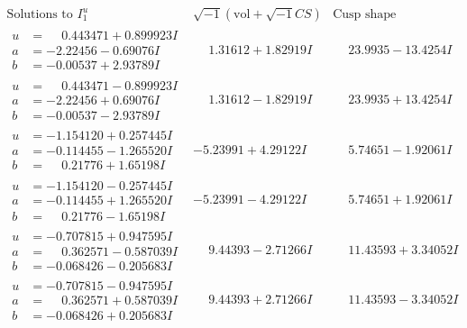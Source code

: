\documentclass[1p]{elsarticle_modified}
\theoremstyle{definition}
\newcommand{\I}{\sqrt{-1}}
\begin{document}
$$\begin{array}{c|c|c}  
\text{Solutions to }I^u_{1}& \I (\text{vol} + \sqrt{-1}CS) & \text{Cusp shape}\\
 \hline 
\begin{aligned}
u &= \phantom{-}0.443471 + 0.899923 I \\
a &= -2.22456 - 0.69076 I \\
b &= -0.00537 + 2.93789 I\end{aligned}
 & \phantom{-}1.31612 + 1.82919 I & \phantom{-}23.9935 - 13.4254 I \\ \hline\begin{aligned}
u &= \phantom{-}0.443471 - 0.899923 I \\
a &= -2.22456 + 0.69076 I \\
b &= -0.00537 - 2.93789 I\end{aligned}
 & \phantom{-}1.31612 - 1.82919 I & \phantom{-}23.9935 + 13.4254 I \\ \hline\begin{aligned}
u &= -1.154120 + 0.257445 I \\
a &= -0.114455 - 1.265520 I \\
b &= \phantom{-}0.21776 + 1.65198 I\end{aligned}
 & -5.23991 + 4.29122 I & \phantom{-}5.74651 - 1.92061 I \\ \hline\begin{aligned}
u &= -1.154120 - 0.257445 I \\
a &= -0.114455 + 1.265520 I \\
b &= \phantom{-}0.21776 - 1.65198 I\end{aligned}
 & -5.23991 - 4.29122 I & \phantom{-}5.74651 + 1.92061 I \\ \hline\begin{aligned}
u &= -0.707815 + 0.947595 I \\
a &= \phantom{-}0.362571 - 0.587039 I \\
b &= -0.068426 - 0.205683 I\end{aligned}
 & \phantom{-}9.44393 - 2.71266 I & \phantom{-}11.43593 + 3.34052 I \\ \hline\begin{aligned}
u &= -0.707815 - 0.947595 I \\
a &= \phantom{-}0.362571 + 0.587039 I \\
b &= -0.068426 + 0.205683 I\end{aligned}
 & \phantom{-}9.44393 + 2.71266 I & \phantom{-}11.43593 - 3.34052 I \\ \hline\begin{aligned}

\end{aligned}
\end{array}$$
\end{document}
